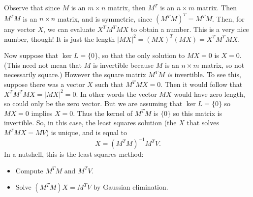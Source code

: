 Observe that since $M$ is an $m\times n$ matrix, then $M^T$ is an $n\times m$ matrix.  Then $M^TM$ is an $n\times n$ matrix, and is symmetric, since $(M^TM)^T=M^TM$.  Then, for any vector $X$, we can evaluate $X^TM^TMX$ to obtain a number.  This is a very nice number, though!  It is just the length $|MX|^2 = (MX)^T(MX)=X^TM^TMX$.


Now suppose that $\ker L=\{0\}$, so that the only solution to $MX=0$ is $X=0$. (This need not mean that $M$ is invertible because $M$ is an $n\times m $ matrix, so not necessarily square.) 
However the square matrix $M^TM$ {\it is} invertible. To see this, suppose there was a vector $X$ such that 
$M^T M X=0$. Then it would follow that $X^T M^T M X = |M X|^2=0$. In other words the vector $MX$ would have zero length, so could only be the zero vector. But we are assuming that $\ker L=\{0\}$ so $MX=0$ implies $X=0$. Thus the kernel of $M^TM$ is $\{0\}$ so this matrix is invertible.
So, in this case, the least squares solution (the $X$ that solves $M^TMX=MV$) is unique, and is equal to 
\[
X = (M^TM)^{-1}M^TV.
\]
In a nutshell, this is the least squares method:

\begin{itemize}
\item Compute $M^TM$ and $M^TV$.
\item Solve $(M^TM)X=M^TV$ by Gaussian elimination.
\end{itemize}


